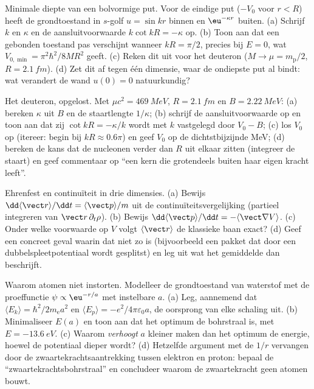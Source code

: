 \begin{exercise}[$\star\star$]\label{exo:b3:schrodinger-three-dimensions:9}
Minimale diepte van een bolvormige put. Voor de eindige put ($-V_0$ voor
$r < R$) heeft de grondtoestand in $s$-golf $u = \sin kr$ binnen en
$\eu^{-\kappa r}$ buiten. (a) Schrijf $k$ en $\kappa$ en de
aansluitvoorwaarde $k\cot kR = -\kappa$ op. (b) Toon aan dat een gebonden
toestand pas verschijnt wanneer $kR = \pi/2$, precies bij $E = 0$, wat
$V_{0,\min} = \pi^2\hbar^2/8MR^2$ geeft. (c) Reken dit uit voor het
deuteron ($M \to \mu = m_{\text{p}}/2$, $R = \qty{2.1}{fm}$). (d) Zet dit
af tegen één dimensie, waar de ondiepste put al bindt: wat verandert de
wand $u(0) = 0$ natuurkundig?
\end{exercise}

\begin{exercise}[$\star\star\star$]\label{exo:b3:schrodinger-three-dimensions:10}
Het deuteron, opgelost. Met $\mu c^2 = \qty{469}{MeV}$, $R =
\qty{2.1}{fm}$ en $B = \qty{2.22}{MeV}$: (a) bereken $\kappa$ uit $B$ en
de staartlengte $1/\kappa$; (b) schrijf de aansluitvoorwaarde op en toon
aan dat zij $\cot kR = -\kappa/k$ wordt met $k$ vastgelegd door $V_0 - B$;
(c) los $V_0$ op (itereer: begin bij $kR \approx 0.6\pi$) en geef $V_0$ op
de dichtstbijzijnde MeV; (d) bereken de kans dat de nucleonen verder dan
$R$ uit elkaar zitten (integreer de staart) en geef commentaar op ``een
kern die grotendeels buiten haar eigen kracht leeft''.
\end{exercise}

\begin{exercise}[$\star\star\star$]\label{exo:b3:schrodinger-three-dimensions:11}
Ehrenfest en continuïteit in drie dimensies. (a) Bewijs
$\dd\langle\vect r\rangle/\dd t = \langle\vect p\rangle/m$ uit de
continuïteitsvergelijking (partieel integreren van $\vect r\,\partial_t\rho$). (b) Bewijs $\dd\langle\vect p\rangle/\dd t =
-\langle\vect\nabla V\rangle$. (c) Onder welke voorwaarde op $V$ volgt
$\langle\vect r\rangle$ de klassieke baan exact? (d) Geef een concreet
geval waarin dat niet zo is (bijvoorbeeld een pakket dat door een
dubbelspleetpotentiaal wordt gesplitst) en leg uit wat het gemiddelde dan
beschrijft.
\end{exercise}

\begin{exercise}[$\star\star\star$]\label{exo:b3:schrodinger-three-dimensions:12}
Waarom atomen niet instorten. Modelleer de grondtoestand van waterstof
met de proeffunctie $\psi \propto \eu^{-r/a}$ met instelbare $a$. (a) Leg,
aannemend dat $\langle E_k\rangle = \hbar^2/2m_{\text{e}}a^2$ en $\langle E_p\rangle = -e^2/4\pi\varepsilon_0a$, de oorsprong van elke schaling
uit. (b) Minimaliseer $E(a)$ en toon aan dat het optimum de bohrstraal is,
met $E = \qty{-13.6}{eV}$. (c) Waarom \emph{verhoogt} $a$ kleiner maken
dan het optimum de energie, hoewel de potentiaal dieper wordt? (d)
Hetzelfde argument met de $1/r$ vervangen door de
zwaartekrachtsaantrekking tussen elektron en proton: bepaal de
``zwaartekrachtsbohrstraal'' en concludeer waarom de zwaartekracht geen
atomen bouwt.
\end{exercise}

